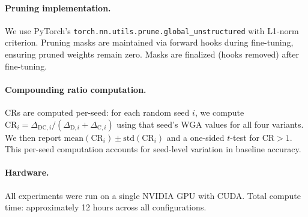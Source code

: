 \documentclass{article}
\newcommand{\CR}{\text{CR}}
\begin{document}
\paragraph{Pruning implementation.}
We use PyTorch's \texttt{torch.nn.utils.prune.global\_unstructured} with L1-norm criterion. Pruning masks are maintained via forward hooks during fine-tuning, ensuring pruned weights remain zero. Masks are finalized (hooks removed) after fine-tuning.

\paragraph{Compounding ratio computation.}
CRs are computed per-seed: for each random seed $i$, we compute $\CR_i = \Delta_{\text{DC},i} / (\Delta_{\text{D},i} + \Delta_{\text{C},i})$ using that seed's WGA values for all four variants. We then report $\text{mean}(\CR_i) \pm \text{std}(\CR_i)$ and a one-sided $t$-test for $\CR > 1$. This per-seed computation accounts for seed-level variation in baseline accuracy.

\paragraph{Hardware.}
All experiments were run on a single NVIDIA GPU with CUDA. Total compute time: approximately 12 hours across all configurations.
\end{document}
